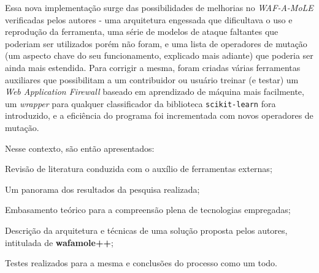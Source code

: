 Essa nova implementação surge das possibilidades de melhorias no \textit{WAF-A-MoLE} verificadas pelos autores - uma arquitetura engessada que dificultava o uso e reprodução da ferramenta, uma série de modelos de ataque faltantes que poderiam ser utilizados porém não foram, e uma lista de operadores de mutação (um aspecto chave do seu funcionamento, explicado mais adiante) que poderia ser ainda mais estendida. Para corrigir a mesma, foram criadas várias ferramentas auxiliares que possibilitam a um contribuidor ou usuário treinar (e testar) um \textit{Web Application Firewall} baseado em aprendizado de máquina mais facilmente, um \textit{wrapper} para qualquer classificador da biblioteca \verb+scikit-learn+ fora introduzido, e a eficiência do programa foi incrementada com novos operadores de mutação.

Nesse contexto, são então apresentados: 
\begin{alineas}
\item Revisão de literatura conduzida com o auxílio de ferramentas externas;
\item Um panorama dos resultados da pesquisa realizada;
\item Embasamento teórico para a compreensão plena de tecnologias empregadas;
\item Descrição da arquitetura e técnicas de uma solução proposta pelos autores, intitulada de \textbf{wafamole++};
\item Testes realizados para a mesma e conclusões do processo como um todo.
\end{alineas}




\bigskip
